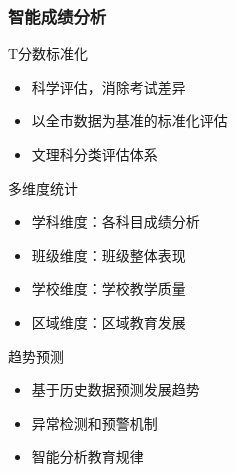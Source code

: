 \documentclass[aspectratio=169]{beamer}
\begin{document}
\begin{frame}
    \frametitle{智能成绩分析}
    \begin{block}{T分数标准化}
        \begin{itemize}
            \item 科学评估，消除考试差异
            \item 以全市数据为基准的标准化评估
            \item 文理科分类评估体系
        \end{itemize}
    \end{block}
    
    \begin{block}{多维度统计}
        \begin{itemize}
            \item 学科维度：各科目成绩分析
            \item 班级维度：班级整体表现
            \item 学校维度：学校教学质量
            \item 区域维度：区域教育发展
        \end{itemize}
    \end{block}
    
    \begin{block}{趋势预测}
        \begin{itemize}
            \item 基于历史数据预测发展趋势
            \item 异常检测和预警机制
            \item 智能分析教育规律
        \end{itemize}
    \end{block}
\end{frame}
\end{document}
